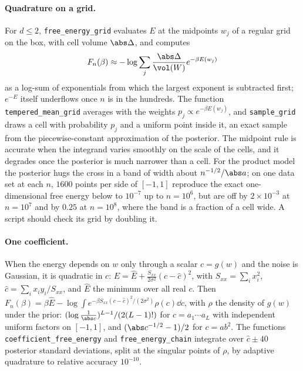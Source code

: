 \begin{refsection}
\paragraph{Quadrature on a grid.} For $d\le2$, \texttt{free\_\allowbreak energy\_\allowbreak grid} evaluates $E$ at the midpoints $w_j$ of a regular grid on the box, with cell volume $\abs\Delta$, and computes
\[
F_n(\beta)\approx-\log\sum_j\frac{\abs\Delta}{\vol(W)}e^{-\beta E(w_j)}
\]
as a log-sum of exponentials from which the largest exponent is subtracted first; $e^{-E}$ itself underflows once $n$ is in the hundreds. The function \texttt{tempered\_\allowbreak mean\_\allowbreak grid} averages with the weights $p_j\propto e^{-\beta E(w_j)}$, and \texttt{sample\_\allowbreak grid} draws a cell with probability $p_j$ and a uniform point inside it, an exact sample from the piecewise-constant approximation of the posterior. The midpoint rule is accurate when the integrand varies smoothly on the scale of the cells, and it degrades once the posterior is much narrower than a cell. For the product model the posterior hugs the cross in a band of width about $n^{-1/2}/\abs a$; on one data set at each $n$, $1600$ points per side of $[-1,1]$ reproduce the exact one-dimensional free energy below to $10^{-7}$ up to $n=10^6$, but are off by $2\times10^{-3}$ at $n=10^7$ and by $0.25$ at $n=10^8$, where the band is a fraction of a cell wide. A script should check its grid by doubling it.

\paragraph{One coefficient.} When the energy depends on $w$ only through a scalar $c=g(w)$ and the noise is Gaussian, it is quadratic in $c$: $E=\hat E+\frac{S_{xx}}{2\sigma^2}(c-\hat c)^2$, with $S_{xx}=\sum_ix_i^2$, $\hat c=\sum_ix_iy_i/S_{xx}$, and $\hat E$ the minimum over all real $c$. Then $F_n(\beta)=\beta\hat E-\log\int e^{-\beta S_{xx}(c-\hat c)^2/(2\sigma^2)}\rho(c)\dd c$, with $\rho$ the density of $g(w)$ under the prior: $(\log\frac1{\abs c})^{L-1}/(2(L-1)!)$ for $c=a_1\cdots a_L$ with independent uniform factors on $[-1,1]$, and $(\abs c^{-1/2}-1)/2$ for $c=ab^2$. The functions \texttt{coefficient\_\allowbreak free\_\allowbreak energy} and \texttt{free\_\allowbreak energy\_\allowbreak chain} integrate over $\hat c\pm40$ posterior standard deviations, split at the singular points of $\rho$, by adaptive quadrature to relative accuracy $10^{-10}$.


\end{refsection}

